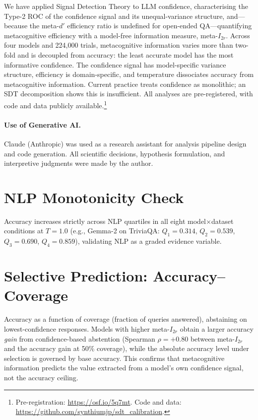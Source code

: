 \documentclass{article}
\begin{document}
We have applied Signal Detection Theory to LLM confidence, characterising the Type-2 ROC of the confidence signal and its unequal-variance structure, and---because the meta-$d'$ efficiency ratio is undefined for open-ended QA---quantifying metacognitive efficiency with a model-free information measure, meta-$I_{2r}$. Across four models and 224{,}000 trials, metacognitive information varies more than two-fold and is decoupled from accuracy: the least accurate model has the most informative confidence. The confidence signal has model-specific variance structure, efficiency is domain-specific, and temperature dissociates accuracy from metacognitive information. Current practice treats confidence as monolithic; an SDT decomposition shows this is insufficient. All analyses are pre-registered, with code and data publicly available.\footnote{Pre-registration: \url{https://osf.io/5q7mt}. Code and data: \url{https://github.com/synthiumjp/sdt_calibration}.}

\paragraph{Use of Generative AI.} Claude (Anthropic) was used as a research assistant for analysis pipeline design and code generation. All scientific decisions, hypothesis formulation, and interpretive judgments were made by the author.




\appendix

\section{NLP Monotonicity Check}
\label{app:monotonicity}
Accuracy increases strictly across NLP quartiles in all eight model$\times$dataset conditions at $T{=}1.0$ (e.g., Gemma-2 on TriviaQA: $Q_1{=}0.314$, $Q_2{=}0.539$, $Q_3{=}0.690$, $Q_4{=}0.859$), validating NLP as a graded evidence variable.

\section{Selective Prediction: Accuracy--Coverage}
\label{app:selective}
Accuracy as a function of coverage (fraction of queries answered), abstaining on lowest-confidence responses. Models with higher meta-$I_{2r}$ obtain a larger accuracy \emph{gain} from confidence-based abstention (Spearman $\rho=+0.80$ between meta-$I_{2r}$ and the accuracy gain at 50\% coverage), while the absolute accuracy level under selection is governed by base accuracy. This confirms that metacognitive information predicts the value extracted from a model's own confidence signal, not the accuracy ceiling.
\end{document}
